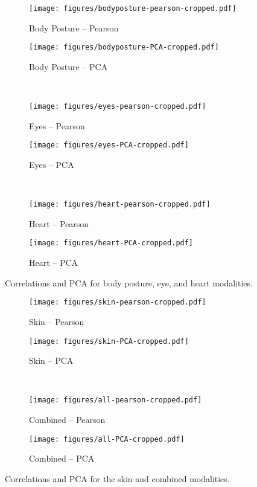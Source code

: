 \documentclass[output=paper]{langsci/langscibook}
\begin{document}
\begin{figure}
    \begin{subfigure}{0.5\textwidth}\centering
        \texttt{[image: figures/bodyposture-pearson-cropped.pdf]}
        \caption{Body Posture -- Pearson}
    \end{subfigure}%
    \begin{subfigure}{0.5\textwidth}\centering
        \texttt{[image: figures/bodyposture-PCA-cropped.pdf]}
        \caption{Body Posture -- PCA}
    \end{subfigure}\bigskip\\
    \begin{subfigure}{0.5\textwidth}\centering
        \texttt{[image: figures/eyes-pearson-cropped.pdf]}
        \caption{Eyes -- Pearson}
    \end{subfigure}%
    \begin{subfigure}{0.5\textwidth}\centering
        \texttt{[image: figures/eyes-PCA-cropped.pdf]}
        \caption{Eyes -- PCA}
    \end{subfigure}\bigskip\\
    \begin{subfigure}{0.5\textwidth}\centering
        \texttt{[image: figures/heart-pearson-cropped.pdf]}
        \caption{Heart -- Pearson}
    \end{subfigure}%
    \begin{subfigure}{0.5\textwidth}\centering
        \texttt{[image: figures/heart-PCA-cropped.pdf]}
        \caption{Heart -- PCA}
    \end{subfigure}
    \caption{Correlations and PCA for body posture, eye, and heart modalities.\label{fig:plotscorrpca2}}
\end{figure}

\begin{figure}
    \begin{subfigure}{0.5\textwidth}\centering
        \texttt{[image: figures/skin-pearson-cropped.pdf]}
        \caption{Skin -- Pearson}
    \end{subfigure}%
    \begin{subfigure}{0.5\textwidth}\centering
        \texttt{[image: figures/skin-PCA-cropped.pdf]}
        \caption{Skin -- PCA}
    \end{subfigure}\bigskip\\
    \begin{subfigure}{0.5\textwidth}\centering
        \texttt{[image: figures/all-pearson-cropped.pdf]}
        \caption{Combined -- Pearson}
    \end{subfigure}%
    \begin{subfigure}{0.5\textwidth}\centering
        \texttt{[image: figures/all-PCA-cropped.pdf]}
        \caption{Combined -- PCA}
    \end{subfigure}
    \caption{Correlations and PCA for the skin and combined modalities.\label{fig:plotscorrpca3}}
\end{figure}
\end{document}
